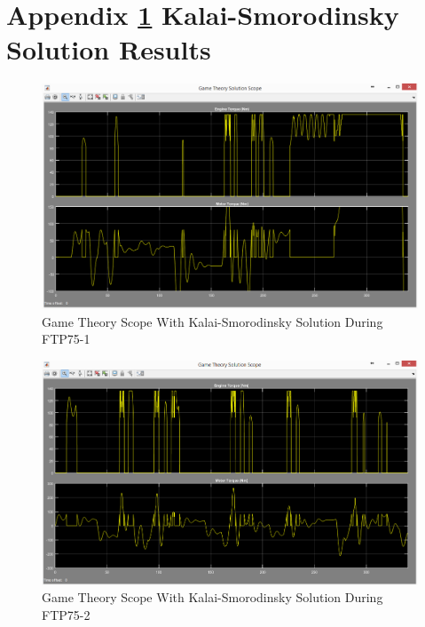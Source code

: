 \chapter{Appendix \ref{app:3} Kalai-Smorodinsky Solution Results}
\label{app:3}

\begin{figure}[h]
\centering
\includegraphics[scale=0.51]{figures/KalaiSmorodinsky/FTP75-1/gameTheory23Juni}
\caption{Game Theory Scope With Kalai-Smorodinsky Solution During FTP75-1}
\label{fig:gtks1}
\end{figure}

\begin{figure}[h]
\centering
\includegraphics[scale=0.49]{figures/KalaiSmorodinsky/FTP75-2/gameTheory23Juni}
\caption{Game Theory Scope With Kalai-Smorodinsky Solution During FTP75-2}
\label{fig:gtks2}
\end{figure}

